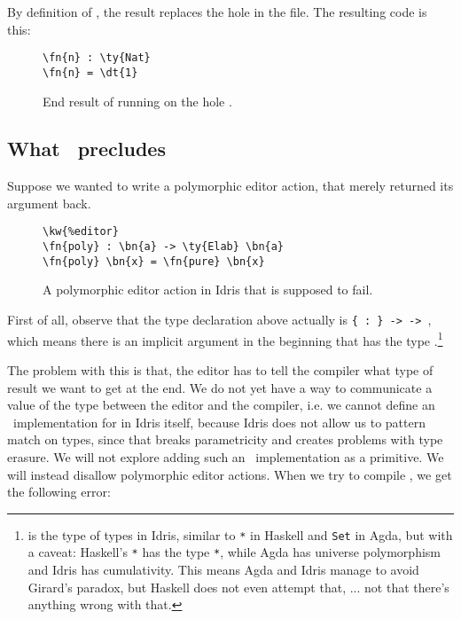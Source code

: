 By definition of , the result  replaces the hole
 in the file. The resulting code is this:

\begin{figure}[ht]
\caption{End result of running  on the hole .}
\begin{Verbatim}[framesep=2mm, label=\footnotesize{\normalfont{Idris}}, labelposition=topline]
\fn{n} : \ty{Nat}
\fn{n} = \dt{1}
\end{Verbatim}
\end{figure}

\subsection{What \Editorable\ precludes}\label{ssec:preclude}

Suppose we wanted to write a polymorphic editor action, that merely returned its argument back.

\begin{figure}[ht]
  \caption{A polymorphic editor action  in Idris that is supposed to fail.}
\begin{Verbatim}[framesep=2mm, label=\footnotesize{\normalfont{Idris}}, labelposition=topline]
\kw{%editor}
\fn{poly} : \bn{a} -> \ty{Elab} \bn{a}
\fn{poly} \bn{x} = \fn{pure} \bn{x}
\end{Verbatim}
\end{figure}

First of all, observe that the type declaration above actually is
\texttt{\{ : \} ->  ->  }, which means
there is an implicit argument in the beginning that has the type
.\footnote{ is the type of types in Idris, similar to
\texttt{*} in Haskell and \texttt{Set} in Agda, but with a caveat:
Haskell's \texttt{*} has the type \texttt{*}\cite{eisenberg}, while Agda has universe
polymorphism and Idris has cumulativity. This means Agda and Idris manage to
avoid Girard's paradox, but Haskell does not even attempt that, ... not that
there's anything wrong with that.}

The problem with this is that, the editor has to tell the compiler what type of
result we want to get at the end. We do not yet have a way to communicate a
value of the type  between the editor and the compiler, i.e. we cannot
define an \Editorable\ implementation for  in Idris itself, because
Idris does not allow us to pattern match on types, since that breaks
parametricity and creates problems with type erasure.\cite{universePat}
We will not explore adding such an \Editorable\ implementation as a primitive.
We will instead disallow polymorphic editor actions.
When we try to compile , we get the following error:

